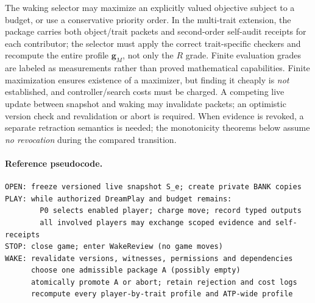 \documentclass[11pt,letterpaper]{article}
\theoremstyle{definition}
\theoremstyle{plain}
\theoremstyle{definition}
\begin{document}
The waking selector may maximize an explicitly valued objective subject to a budget, or use a conservative priority order. In the multi-trait extension, the package carries both object/trait packets and second-order self-audit receipts for each contributor; the selector must apply the correct trait-specific checkers and recompute the entire profile $\mathbf g_M$, not only the $R$ grade. Finite evaluation grades are labeled as measurements rather than proved mathematical capabilities. Finite maximization ensures existence of a maximizer, but finding it cheaply is \emph{not} established, and controller/search costs must be charged. A competing live update between snapshot and waking may invalidate packets; an optimistic version check and revalidation or abort is required. When evidence is revoked, a separate retraction semantics is needed; the monotonicity theorems below assume \emph{no revocation} during the compared transition.

\begin{center}
\end{center}

\begin{samepage}
\paragraph{Reference pseudocode.}\vspace{-1ex}
\begin{verbatim}
OPEN: freeze versioned live snapshot S_e; create private BANK copies
PLAY: while authorized DreamPlay and budget remains:
        P0 selects enabled player; charge move; record typed outputs
        all involved players may exchange scoped evidence and self-receipts
STOP: close game; enter WakeReview (no game moves)
WAKE: revalidate versions, witnesses, permissions and dependencies
      choose one admissible package A (possibly empty)
      atomically promote A or abort; retain rejection and cost logs
      recompute every player-by-trait profile and ATP-wide profile
\end{verbatim}
\end{samepage}
\end{document}
